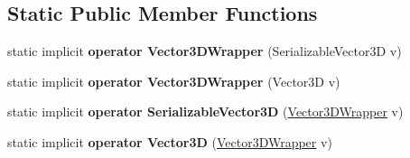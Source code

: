 \subsection*{Static Public Member Functions}
\begin{DoxyCompactItemize}
\item 
\hypertarget{struct_s_e_mod_a_p_i_1_1_a_p_i_1_1_vector3_d_wrapper_ad32c8d3aa43aa888dc6c0c3d015c4b7a}{}static implicit {\bfseries operator Vector3\+D\+Wrapper} (Serializable\+Vector3\+D v)\label{struct_s_e_mod_a_p_i_1_1_a_p_i_1_1_vector3_d_wrapper_ad32c8d3aa43aa888dc6c0c3d015c4b7a}

\item 
\hypertarget{struct_s_e_mod_a_p_i_1_1_a_p_i_1_1_vector3_d_wrapper_a5e91cc2ac7f0700b6db28ab60fa8b324}{}static implicit {\bfseries operator Vector3\+D\+Wrapper} (Vector3\+D v)\label{struct_s_e_mod_a_p_i_1_1_a_p_i_1_1_vector3_d_wrapper_a5e91cc2ac7f0700b6db28ab60fa8b324}

\item 
\hypertarget{struct_s_e_mod_a_p_i_1_1_a_p_i_1_1_vector3_d_wrapper_affd4a96f781ff37b1676297b529de4e8}{}static implicit {\bfseries operator Serializable\+Vector3\+D} (\hyperlink{struct_s_e_mod_a_p_i_1_1_a_p_i_1_1_vector3_d_wrapper}{Vector3\+D\+Wrapper} v)\label{struct_s_e_mod_a_p_i_1_1_a_p_i_1_1_vector3_d_wrapper_affd4a96f781ff37b1676297b529de4e8}

\item 
\hypertarget{struct_s_e_mod_a_p_i_1_1_a_p_i_1_1_vector3_d_wrapper_a7fd4a01ef55cff802751c8eba99539d8}{}static implicit {\bfseries operator Vector3\+D} (\hyperlink{struct_s_e_mod_a_p_i_1_1_a_p_i_1_1_vector3_d_wrapper}{Vector3\+D\+Wrapper} v)\label{struct_s_e_mod_a_p_i_1_1_a_p_i_1_1_vector3_d_wrapper_a7fd4a01ef55cff802751c8eba99539d8}

\end{DoxyCompactItemize}

